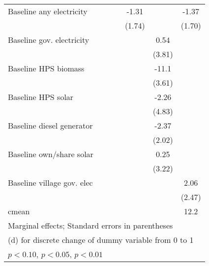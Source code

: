 \begin{table}[htbp]
\begin{tabular*}{1\hsize}{@{\hskip\tabcolsep\extracolsep\fill}l*{6}{c}}
Baseline any electricity&                  &                  &                  &    -1.31         &                  &    -1.37         \\
                &                  &                  &                  &   (1.74)         &                  &   (1.70)         \\
Baseline gov. electricity&                  &                  &                  &                  &     0.54         &                  \\
                &                  &                  &                  &                  &   (3.81)         &                  \\
Baseline HPS biomass&                  &                  &                  &                  &    -11.1\sym{***}&                  \\
                &                  &                  &                  &                  &   (3.61)         &                  \\
Baseline HPS solar&                  &                  &                  &                  &    -2.26         &                  \\
                &                  &                  &                  &                  &   (4.83)         &                  \\
Baseline diesel generator&                  &                  &                  &                  &    -2.37         &                  \\
                &                  &                  &                  &                  &   (2.02)         &                  \\
Baseline own/share solar&                  &                  &                  &                  &     0.25         &                  \\
                &                  &                  &                  &                  &   (3.22)         &                  \\
Baseline village gov. elec&                  &                  &                  &                  &                  &     2.06         \\
                &                  &                  &                  &                  &                  &   (2.47)         \\
\midrule
cmean           &                  &                  &                  &                  &                  &     12.2         \\
\bottomrule
\multicolumn{7}{l}{\footnotesize Marginal effects; Standard errors in parentheses}\\
\multicolumn{7}{l}{\footnotesize  (d) for discrete change of dummy variable from 0 to 1}\\
\multicolumn{7}{l}{\footnotesize \sym{*} \(p<0.10\), \sym{**} \(p<0.05\), \sym{***} \(p<0.01\)}\\
\end{tabular*}
\end{table}
